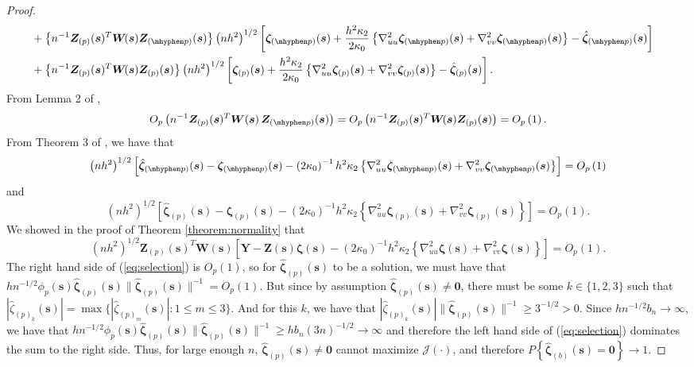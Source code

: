 \documentclass[authoryear,review, 12pt]{elsarticle}
\begin{document}
\begin{proof}
\begin{align}
 & \mkern-18mu+\left\{ n^{-1}\bm{Z}_{(p)}(\bm{s})^{T}\bm{W}\!(\bm{s})\bm{Z}_{(\mhyphen p)}(\bm{s})\right\} \left(nh^{2}\right)^{1/2}\left[\bm{\zeta}_{(\mhyphen p)}(\bm{s})+\frac{h^{2}\kappa_{2}}{2\kappa_{0}}\left\{ \nabla_{uu}^{2}\bm{\zeta}_{(\mhyphen p)}(\bm{s})+\nabla_{vv}^{2}\bm{\zeta}_{(\mhyphen p)}(\bm{s})\right\} -\hat{\bm{\zeta}}_{(\mhyphen p)}(\bm{s})\right]\nonumber \\
 & \mkern-18mu+\left\{ n^{-1}\bm{Z}_{(p)}(\bm{s})^{T}\bm{W}\!(\bm{s})\bm{Z}_{(p)}(\bm{s})\right\} \left(nh^{2}\right)^{1/2}\left[\bm{\zeta}_{(p)}(\bm{s})+\frac{h^{2}\kappa_{2}}{2\kappa_{0}}\left\{ \nabla_{uu}^{2}\bm{\zeta}_{(p)}(\bm{s})+\nabla_{vv}^{2}\bm{\zeta}_{(p)}(\bm{s})\right\} -\hat{\bm{\zeta}}_{(p)}(\bm{s})\right].\label{eq:selection}
\end{align}
From Lemma 2 of \citet{Sun-Yan-Zhang-Lu-2014}, 
\[
O_{p}\left(n^{-1}\bm{Z}_{(p)}(\bm{s})^{T}\bm{W}\!\left(\bm{s}\right)\bm{Z}_{(\mhyphen p)}(\bm{s})\right)=O_{p}\left(n^{-1}\bm{Z}_{(p)}(\bm{s})^{T}\bm{W}\!(\bm{s})\bm{Z}_{(p)}(\bm{s})\right)=O_{p}\left(1\right).
\]
From Theorem 3 of \citet{Sun-Yan-Zhang-Lu-2014}, we have that 
\[
\left(nh^{2}\right)^{1/2}\left[\hat{\bm{\zeta}}_{(\mhyphen p)}(\bm{s})-\bm{\zeta}_{(\mhyphen p)}(\bm{s})-\left(2\kappa_{0}\right)^{-1}h^{2}\kappa_{2}\left\{ \nabla_{uu}^{2}\bm{\zeta}_{(\mhyphen p)}(\bm{s})+\nabla_{vv}^{2}\bm{\zeta}_{(\mhyphen p)}(\bm{s})\right\} \right]=O_{p}\left(1\right)
\]
 and 
\[
\left(nh^{2}\right)^{1/2}\left[\hat{\bm{\zeta}}_{(p)}(\bm{s})-\bm{\zeta}_{(p)}(\bm{s})-\left(2\kappa_{0}\right)^{-1}h^{2}\kappa_{2}\left\{ \nabla_{uu}^{2}\bm{\zeta}_{(p)}(\bm{s})+\nabla_{vv}^{2}\bm{\zeta}_{(p)}(\bm{s})\right\} \right]=O_{p}\left(1\right).
\]
We showed in the proof of Theorem \ref{theorem:normality} that
\[
\left(nh^{2}\right)^{1/2}\bm{Z}_{(p)}(\bm{s})^{T}\bm{W}\!(\bm{s})\left[\bm{Y}-\bm{Z}\!(\bm{s})\bm{\zeta}(\bm{s})-\left(2\kappa_{0}\right)^{-1}h^{2}\kappa_{2}\left\{ \nabla_{uu}^{2}\bm{\zeta}(\bm{s})+\nabla_{vv}^{2}\bm{\zeta}(\bm{s})\right\} \right]=O_{p}\left(1\right).
\]
The right hand side of (\ref{eq:selection}) is $O_{p}(1)$, so for
$\hat{\bm{\zeta}}_{(p)}(\bm{s})$ to be a solution, we must have that
$hn^{-1/2}\phi_{p}(\bm{s})\hat{\bm{\zeta}}_{(p)}(\bm{s})\|\hat{\bm{\zeta}}_{(p)}(\bm{s})\|^{-1}=O_{p}\left(1\right)$.
But since by assumption $\hat{\bm{\zeta}}_{(p)}(\bm{s})\ne\bm{0}$,
there must be some $k\in\{1,2,3\}$ such that $|\hat{\zeta}_{(p)_{k}}(\bm{s})|=\max\{|\hat{\zeta}_{(p)_{m}}(\bm{s})|:1\le m\le3\}$.
And for this $k$, we have that $|\hat{\zeta}_{(p)_{k}}(\bm{s})|\|\hat{\bm{\zeta}}_{(p)}(\bm{s})\|^{-1}\ge3^{-1/2}>0$.
Since $hn^{-1/2}b_{n}\to\infty$, we have that $hn^{-1/2}\phi_{p}(\bm{s})\hat{\bm{\zeta}}_{(p)}(\bm{s})\|\hat{\bm{\zeta}}_{(p)}(\bm{s})\|^{-1}\ge hb_{n}\left(3n\right)^{-1/2}\to\infty$
and therefore the left hand side of (\ref{eq:selection}) dominates
the sum to the right side. Thus, for large enough $n$, $\hat{\bm{\zeta}}_{(p)}(\bm{s})\ne\bm{0}$
cannot maximize $\mathcal{J}\left(\cdot\right)$, and therefore $P\left\{ \hat{\bm{\zeta}}_{(b)}(\bm{s})=\bm{0}\right\} \to1$. 
\end{proof}
\end{document}
